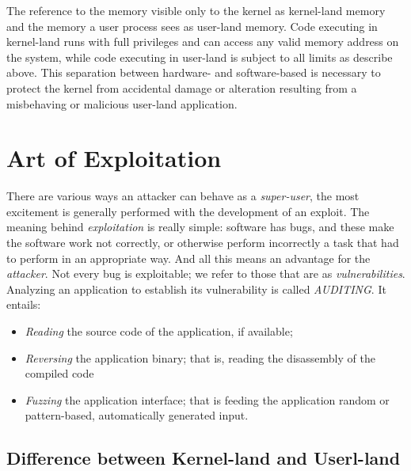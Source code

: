 \documentclass{masterthesis}
\begin{document}
The reference to the memory visible only to the kernel as kernel-land memory and the memory a user process sees as user-land memory.
Code executing in kernel-land runs with full privileges and can access any valid memory address on the system, while code executing in user-land is subject to all limits as describe above. This separation between hardware- and software-based is necessary to protect the kernel from accidental damage or alteration resulting from a misbehaving or malicious user-land application.

\chapter{Art of Exploitation}
\label{ch:exploitation}

There are various ways an attacker can behave as a \emph{super-user}, the most excitement is generally performed with the development of an exploit.
The meaning behind \emph{exploitation} is really simple: software has bugs, and these make the software work not correctly, or otherwise perform incorrectly a task that had to perform in an appropriate way. 
And all this means an advantage for the \emph{attacker}. Not every bug is exploitable; we refer to those that are as \emph{vulnerabilities}.
Analyzing an application to establish its vulnerability is called \emph{AUDITING}. It entails: 
\begin{itemize}
\item \emph{Reading} the source code of the application, if available;
\item \emph{Reversing} the application binary; that is, reading the disassembly of the compiled code
\item \emph{Fuzzing} the application interface; that is feeding the application random or pattern-based, automatically generated input.
\end{itemize}

\section{Difference between Kernel-land and Userl-land}
\label{sect:land}
\end{document}
